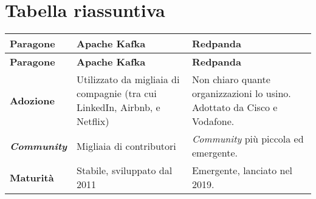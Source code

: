 \section{Tabella riassuntiva}

\begin{longtable}{|>{\centering\arraybackslash}p{}|>{\centering\arraybackslash}p{}|>{\centering\arraybackslash}p{}|}
	\hline
	\textbf{Paragone}                    & \textbf{Apache Kafka}                                                                                                                                       & \textbf{Redpanda}                                                                                                                                                                \\
	\hline
	\endfirsthead
	\hline
	\textbf{Paragone}                    & \textbf{Apache Kafka}                                                                                                                                       & \textbf{Redpanda}                                                                                                                                                                \\
	\endhead
	\hline
	\textbf{Adozione}                    & Utilizzato da migliaia di compagnie (tra cui LinkedIn, Airbnb, e Netflix)                                                                                   & Non chiaro quante organizzazioni lo usino. Adottato da Cisco e Vodafone.                                                                                                         \\
	\hline
	\textbf{\textit{Community}}          & Migliaia di contributori                                                                                                                                    & \textit{Community} più piccola ed emergente.                                                                                                                                     \\
	\hline
	\textbf{Maturità}                    & Stabile, sviluppato dal 2011                                                                                                                                & Emergente, lanciato nel 2019.                                                                                                                                                    \\
	\hline

\end{longtable}

